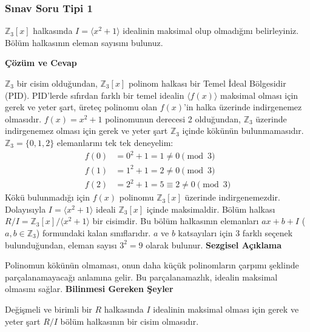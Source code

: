 \documentclass[11pt, a4paper]{article}
\newenvironment{cozum}{
    \vspace{0.5cm}
    \noindent\textcolor{green!60!black}{\faCheckCircle\enspace \textbf{\Large Çözüm ve Cevap}}\par\vspace{0.2cm}
}{}
\newenvironment{sezgisel}{
    \vspace{0.5cm}
    \noindent\textcolor{orange!80!black}{\faLightbulb\enspace \textbf{\Large Sezgisel Açıklama}}\par\vspace{0.2cm}
    \itshape
}{}
\newenvironment{bilgi}{
    \vspace{0.5cm}
    \noindent\textcolor{red!70!black}{\faExclamationTriangle\enspace \textbf{\Large Bilinmesi Gereken Şeyler}}\par\vspace{0.2cm}
}{}
\begin{document}
\subsubsection{Sınav Soru Tipi 1}
\begin{sinavbox}
$\mathbb{Z}_{3}[x]$ halkasında $I = \langle x^2+1 \rangle$ idealinin maksimal olup olmadığını belirleyiniz. Bölüm halkasının eleman sayısını bulunuz.
\end{sinavbox}
\begin{cozum}
$\mathbb{Z}_3$ bir cisim olduğundan, $\mathbb{Z}_3[x]$ polinom halkası bir Temel İdeal Bölgesidir (PID). PID'lerde sıfırdan farklı bir temel idealin $\langle f(x) \rangle$ maksimal olması için gerek ve yeter şart, üreteç polinomu olan $f(x)$'in halka üzerinde indirgenemez olmasıdır. $f(x) = x^2+1$ polinomunun derecesi 2 olduğundan, $\mathbb{Z}_3$ üzerinde indirgenemez olması için gerek ve yeter şart $\mathbb{Z}_3$ içinde kökünün bulunmamasıdır. $\mathbb{Z}_3 = \{0, 1, 2\}$ elemanlarını tek tek deneyelim:
\begin{align*}
f(0) &= 0^2+1 = 1 \neq 0 \pmod 3 \\
f(1) &= 1^2+1 = 2 \neq 0 \pmod 3 \\
f(2) &= 2^2+1 = 5 \equiv 2 \neq 0 \pmod 3
\end{align*}
Kökü bulunmadığı için $f(x)$ polinomu $\mathbb{Z}_3[x]$ üzerinde indirgenemezdir. Dolayısıyla $I = \langle x^2+1 \rangle$ ideali $\mathbb{Z}_3[x]$ içinde maksimaldir. 
Bölüm halkası $R/I = \mathbb{Z}_3[x] / \langle x^2+1 \rangle$ bir cisimdir. Bu bölüm halkasının elemanları $ax+b + I$ ($a, b \in \mathbb{Z}_3$) formundaki kalan sınıflarıdır. $a$ ve $b$ katsayıları için $3$ farklı seçenek bulunduğundan, eleman sayısı $3^2 = 9$ olarak bulunur.
\end{cozum}
\begin{sezgisel}
Polinomun kökünün olmaması, onun daha küçük polinomların çarpımı şeklinde parçalanamayacağı anlamına gelir. Bu parçalanamazlık, idealin maksimal olmasını sağlar.
\end{sezgisel}
\begin{bilgi}
Değişmeli ve birimli bir $R$ halkasında $I$ idealinin maksimal olması için gerek ve yeter şart $R/I$ bölüm halkasının bir cisim olmasıdır.
\end{bilgi}

\newpage
\end{document}

